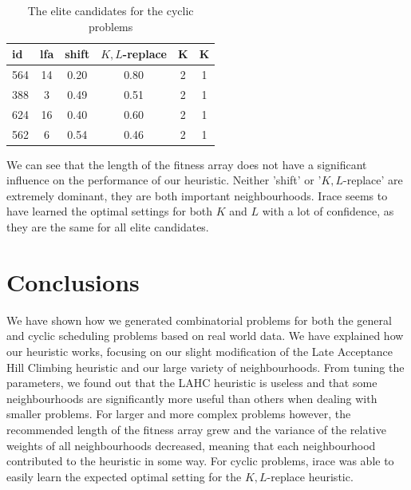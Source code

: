 \documentclass[]{article}
\begin{document}
\begin{table}[]
	\centering
	\begin{tabular}{lccccc}
		\hline
		id &lfa&   shift & $K,L$-replace& K& K \\ \hline
		564 & 14 &0.20& 0.80& 2 &1           \\
		388  & 3 &0.49 &0.51 &2 &1           \\
		624  &16 &0.40 &0.60 &2 &1           \\
		562  & 6 &0.54 &0.46 &2 &1           \\ \hline
	\end{tabular}
	\caption{The elite candidates for the cyclic problems}
	\label{tbl:cyclic}
\end{table}
We can see that the length of the fitness array does not have a significant influence on the performance of our heuristic. Neither 'shift' or '$K,L$-replace' are extremely dominant, they are both important neighbourhoods. Irace seems to have learned the optimal settings for both $K$ and $L$ with a lot of confidence, as they are the same for all elite candidates.



\section{Conclusions}
We have shown how we generated combinatorial problems for both the general and cyclic scheduling problems based on real world data. We have explained how our heuristic works, focusing on our slight modification of the Late Acceptance Hill Climbing heuristic and our large variety of neighbourhoods. From tuning the parameters, we found out that the LAHC heuristic is useless and that some neighbourhoods are significantly more useful than others when dealing with smaller problems. For larger and more complex problems however, the recommended length of the fitness array grew and the variance of the relative weights of all neighbourhoods decreased, meaning that each neighbourhood contributed to the heuristic in some way. For cyclic problems, irace was able to easily learn the expected optimal setting for the $K,L$-replace heuristic.



\end{document}
